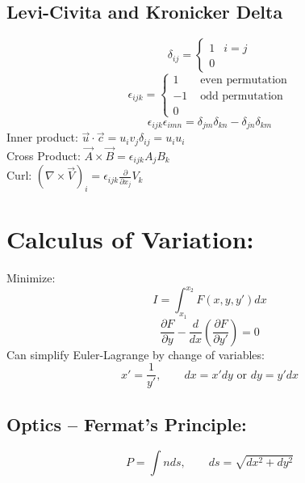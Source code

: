 \documentclass[a4paper,norsk, 10pt]{article}
\begin{document}
\subsection{Levi-Civita and Kronicker Delta}
\begin{equation}
\delta_{ij} = 
\begin{cases}
1 & i = j\\
0
\end{cases}
\end{equation}
\begin{equation}
\epsilon_{ijk} = 
\begin{cases}
1 & \text{ even permutation}\\
-1 & \text{ odd permutation}\\
0
\end{cases}
\end{equation}
\begin{equation}
\epsilon_{ijk}\epsilon_{imn} = \delta_{jm}\delta_{kn} - \delta_{jn}\delta_{km}
\end{equation}
Inner product: $\vec{u}\cdot\vec{c} = u_iv_j\delta_{ij} = u_iu_i$\\
Cross Product: $\vec{A}\times\vec{B} = \epsilon_{ijk}A_jB_k$\\
Curl: $(\nabla\times\vec{V})_i = \epsilon_{ijk}\frac{\partial}{\partial x_j}V_k$
\section{Calculus of Variation:}
Minimize:
\begin{equation}
I = \int_{x_1}^{x_2}F(x,y,y') dx
\end{equation}
\begin{equation}
\frac{\partial F}{\partial y} - \frac{d}{dx}\left(\frac{\partial F}{\partial y'}\right) = 0
\end{equation}
Can simplify Euler-Lagrange by change of variables:
\begin{equation}
x' = \frac{1}{y'}, \qquad dx = x'dy \text{ or } dy = y'dx
\end{equation}
\subsection{Optics -- Fermat's Principle:}
\begin{equation}
P = \int n ds, \qquad ds = \sqrt{dx^2 + dy^2}
\end{equation}
\end{document}
